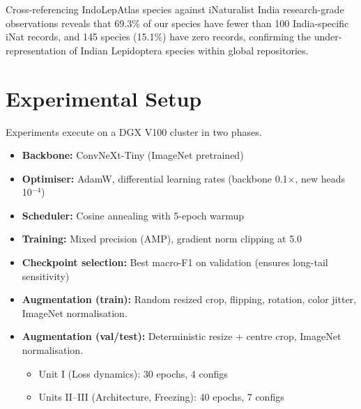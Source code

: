 \documentclass[runningheads]{llncs}
\begin{document}
Cross-referencing IndoLepAtlas species against iNaturalist India research-grade observations reveals that 69.3\% of our species have fewer than 100 India-specific iNat records, and 145 species (15.1\%) have zero records, confirming the under-representation of Indian Lepidoptera species within global repositories.

\section{Experimental Setup}
Experiments execute on a DGX V100 cluster in two phases.
\begin{itemize}
    \item \textbf{Backbone:} ConvNeXt-Tiny (ImageNet pretrained)
    \item \textbf{Optimiser:} AdamW, differential learning rates (backbone 0.1$\times$, new heads 10$^{-4}$)
    \item \textbf{Scheduler:} Cosine annealing with 5-epoch warmup
    \item \textbf{Training:} Mixed precision (AMP), gradient norm clipping at 5.0
    \item \textbf{Checkpoint selection:} Best macro-F1 on validation (ensures long-tail sensitivity)
    \item \textbf{Augmentation (train):} Random resized crop, flipping, rotation, color jitter, ImageNet normalisation.
    \item \textbf{Augmentation (val/test):} Deterministic resize + centre crop, ImageNet normalisation.
    \begin{itemize}
        \item Unit I (Loss dynamics): 30 epochs, 4 configs
        \item Units II–III (Architecture, Freezing): 40 epochs, 7 configs
    \end{itemize}
\end{itemize}
\end{document}
